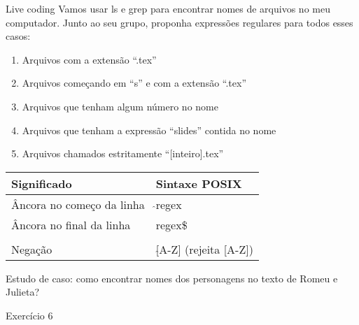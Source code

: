 \documentclass{beamer}
\begin{document}
\begin{frame}{Live coding}
  \centering
  \large
  Vamos usar ls e grep para encontrar nomes de arquivos no meu computador. Junto
  ao seu grupo, proponha expressões regulares para todos esses casos:
  \begin{enumerate}
    \item Arquivos com a extensão ``.tex''
    \item Arquivos começando em ``s'' e com a extensão ``.tex''
    \item Arquivos que tenham algum número no nome
    \item Arquivos que tenham a expressão ``slides'' contida no nome
    \item Arquivos chamados estritamente ``[inteiro].tex''
  \end{enumerate}
\end{frame}

\begin{frame}
  \large
  \begin{tabular}{p{5cm} | p{5cm} }
    Significado & Sintaxe POSIX \\ \hline
    Âncora no começo da linha & $\hat{ }${regex} \\ \hline
    Âncora no final da linha & {regex}\$ \\ \hline
    \\
    Negação & [$\hat{ }$A-Z] (rejeita [A-Z]) \\ \hline
  \end{tabular}
  Estudo de caso: como encontrar nomes dos personagens no texto de Romeu e
  Julieta?
\end{frame}

\begin{frame}{Exercício 6}
  \centering
  \Large
\end{frame}
\end{document}
